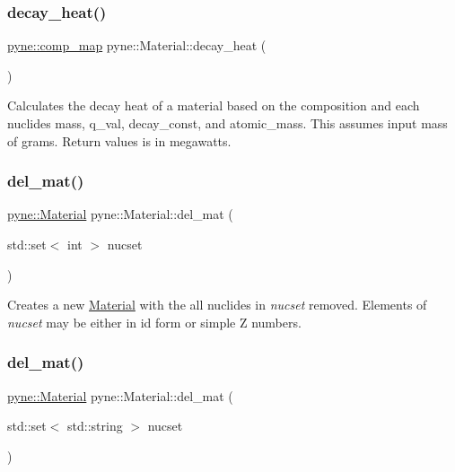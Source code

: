 \subsubsection{\texorpdfstring{decay\+\_\+heat()}{decay\_heat()}}
{\footnotesize\ttfamily \hyperlink{namespacepyne_a86738cecccf4ce3f4ecc2ff6f45ce1a2}{pyne\+::comp\+\_\+map} pyne\+::\+Material\+::decay\+\_\+heat (\begin{DoxyParamCaption}{ }\end{DoxyParamCaption})}

Calculates the decay heat of a material based on the composition and each nuclide\textquotesingle{}s mass, q\+\_\+val, decay\+\_\+const, and atomic\+\_\+mass. This assumes input mass of grams. Return values is in megawatts. \mbox{\label{classpyne_1_1_material_a34944c4d3c0627ea41d5c7631d080094}} 
\subsubsection{\texorpdfstring{del\+\_\+mat()}{del\_mat()}\hspace{0.1cm}{\footnotesize\ttfamily [1/2]}}
{\footnotesize\ttfamily \hyperlink{classpyne_1_1_material}{pyne\+::\+Material} pyne\+::\+Material\+::del\+\_\+mat (\begin{DoxyParamCaption}\item[{std\+::set$<$ int $>$}]{nucset }\end{DoxyParamCaption})}

Creates a new \hyperlink{classpyne_1_1_material}{Material} with the all nuclides in {\itshape nucset} removed. Elements of {\itshape nucset} may be either in id form or simple Z numbers. \mbox{\label{classpyne_1_1_material_a3989e723460e0acffb37163a7f7002c0}} 
\subsubsection{\texorpdfstring{del\+\_\+mat()}{del\_mat()}\hspace{0.1cm}{\footnotesize\ttfamily [2/2]}}
{\footnotesize\ttfamily \hyperlink{classpyne_1_1_material}{pyne\+::\+Material} pyne\+::\+Material\+::del\+\_\+mat (\begin{DoxyParamCaption}\item[{std\+::set$<$ std\+::string $>$}]{nucset }\end{DoxyParamCaption})}

